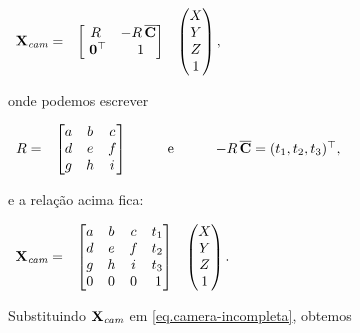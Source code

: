 \begin{center}
$
\begin{array}{ccc}
\mathbf{X}_{\textit{cam}}=
&
\begin{bmatrix}
R&-R\,\overline{\bf C}\\
\,\,{\bf 0}^\top&\,\,1
\end{bmatrix}
&
\begin{pmatrix}
X\\
Y\\
Z\\
1
\end{pmatrix},
\end{array}
$
\end{center} 
onde podemos escrever

\begin{center}
$
\begin{array}{cccc}
R=
&
\begin{bmatrix}
a&b&c\\
d&e&f\\
g&h&i
\end{bmatrix}
&
\qquad\text{e}\qquad
&
-R\,\overline{\bf C}=(t_1,t_2,t_3)^\top,
\end{array}
$
\end{center}
e a relação acima fica:

\begin{center}
$
\begin{array}{ccc}
\mathbf{X}_{\textit{cam}}=
&
\begin{bmatrix}
a&b&c&t_1\\
d&e&f&t_2\\
g&h&i&t_3\\
0&0&0&\,1
\end{bmatrix}
&
\begin{pmatrix}
X\\
Y\\
Z\\
1
\end{pmatrix}.
\end{array}
$
\end{center}

Substituindo $\mathbf{X}_{\textit{cam}}$ em \ref{eq.camera-incompleta}, obtemos

